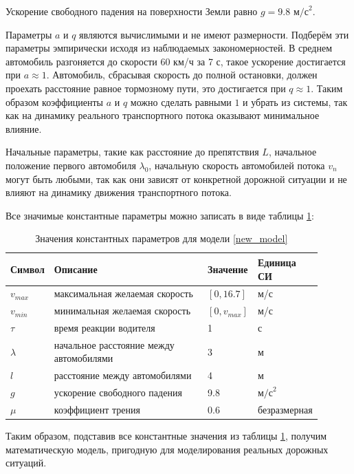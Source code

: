 \documentclass[12pt, a4paper]{extarticle}
\numberwithin{equation}{section}
\numberwithin{figure}{section}
\begin{document}
Ускорение свободного падения на поверхности Земли равно $g=9.8 \text{ м/с}^2$.

Параметры $a$ и $q$ являются вычислимыми и не имеют размерности. Подберём эти параметры эмпирически исходя из наблюдаемых закономерностей. В среднем автомобиль разгоняется до скорости 60 км/ч за 7 с, такое ускорение достигается при $a\approx1$. Автомобиль, сбрасывая скорость до полной остановки, должен проехать расстояние равное тормозному пути, это достигается при $q\approx1$. Таким образом коэффициенты $a$ и $q$ можно сделать равными $1$ и убрать из системы, так как на динамику реального транспортного потока оказывают минимальное влияние.

Начальные параметры, такие как расстояние до препятствия $L$, начальное положение первого автомобиля $\lambda_0$, начальную скорость автомобилей потока $v_n$ могут быть любыми, так как они зависят от конкретной дорожной ситуации и не влияют на динамику движения транспортного потока.

Все значимые константные параметры можно записать в виде таблицы \ref{real_parameters}:
\begin{table}[h!]
	\caption{Значения константных параметров для модели \eqref{new_model} }
	\label{real_parameters}
	\begin{center}
		\begin{tabularx}{\textwidth}{p{0.12\linewidth}p{0.52\linewidth}p{0.11\linewidth}p{0.15\linewidth}}			
			\hline
			\rule{0cm}{0,5cm}
			Символ & Описание & Значение & Единица СИ \\
			[3pt]\hline
			$v_{max}$ & максимальная желаемая скорость& $[0,16.7]$&м/с\\
			$v_{min}$ & минимальная желаемая скорость& $[0,v_{max}]$&м/с\\ 
			$\tau$ & время реакции водителя& 1&с\\
			$\lambda$ & начальное расстояние между автомобилями& 3&м\\
			$l$ & расстояние между автомобилями& 4&м\\
			$g$ & ускорение свободного падения& 9.8&$\text{м/с}^2$\\ 
			$\mu$ &  коэффициент трения& 0.6& безразмерная\\ 
			\hline
		\end{tabularx}
	\end{center}
\end{table}

Таким образом, подставив все константные значения из таблицы \ref{real_parameters}, получим математическую модель, пригодную для моделирования реальных дорожных ситуаций.
\end{document}
